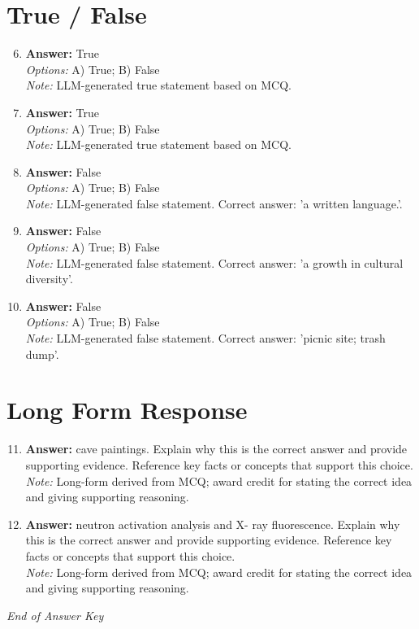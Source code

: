 \documentclass[12pt]{article}
\begin{document}
\section*{True / False}
\begin{enumerate}[label=\arabic*.]
\setcounter{enumi}{5}
\item \textbf{Answer:} True
\\ \textit{Options:} A) True; B) False
\\ \textit{Note:} LLM-generated true statement based on MCQ.
\item \textbf{Answer:} True
\\ \textit{Options:} A) True; B) False
\\ \textit{Note:} LLM-generated true statement based on MCQ.
\item \textbf{Answer:} False
\\ \textit{Options:} A) True; B) False
\\ \textit{Note:} LLM-generated false statement. Correct answer: 'a written language.'.
\item \textbf{Answer:} False
\\ \textit{Options:} A) True; B) False
\\ \textit{Note:} LLM-generated false statement. Correct answer: 'a growth in cultural diversity'.
\item \textbf{Answer:} False
\\ \textit{Options:} A) True; B) False
\\ \textit{Note:} LLM-generated false statement. Correct answer: 'picnic site; trash dump'.
\end{enumerate}

\section*{Long Form Response}
\begin{enumerate}[label=\arabic*.]
\setcounter{enumi}{10}
\item \textbf{Answer:} cave paintings. Explain why this is the correct answer and provide supporting evidence. Reference key facts or concepts that support this choice.
\\ \textit{Note:} Long-form derived from MCQ; award credit for stating the correct idea and giving supporting reasoning.
\item \textbf{Answer:} neutron activation analysis and X- ray fluorescence. Explain why this is the correct answer and provide supporting evidence. Reference key facts or concepts that support this choice.
\\ \textit{Note:} Long-form derived from MCQ; award credit for stating the correct idea and giving supporting reasoning.
\end{enumerate}

\vfill
\noindent\textit{End of Answer Key}
\end{document}
